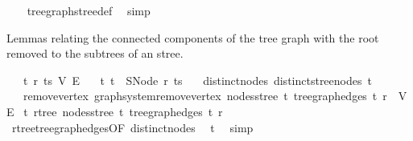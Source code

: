 \begin{isabellebody}
\ \ %
\endisadelimproof
%
\isatagproof
{}\isamarkupfalse%
\ tree{\isacharunderscore}{\kern0pt}graph{\isacharunderscore}{\kern0pt}stree{\isacharunderscore}{\kern0pt}def\ \isamarkupfalse%
\ simp%
\endisatagproof
{\isafoldproof}%
%
\isadelimproof
%
\endisadelimproof
%
\begin{isamarkuptext}%
Lemmas relating the connected components of the tree graph with the root removed to the subtrees of an stree.%
\end{isamarkuptext}\isamarkuptrue%
\isamarkupfalse%
\isanewline
\ \ \ t\ r\ ts\ V{\isacharprime}{\kern0pt}\ E{\isacharprime}{\kern0pt}\isanewline
\ \ \ t{\isacharcolon}{\kern0pt}\ {\isachardoublequoteopen}t\ {\isacharequal}{\kern0pt}\ SNode\ r\ ts{\isachardoublequoteclose}\isanewline
\ \ \ distinct{\isacharunderscore}{\kern0pt}nodes{\isacharcolon}{\kern0pt}\ {\isachardoublequoteopen}distinct{\isacharunderscore}{\kern0pt}stree{\isacharunderscore}{\kern0pt}nodes\ t{\isachardoublequoteclose}\isanewline
\ \ \ remove{\isacharunderscore}{\kern0pt}vertex{\isacharcolon}{\kern0pt}\ {\isachardoublequoteopen}graph{\isacharunderscore}{\kern0pt}system{\isachardot}{\kern0pt}remove{\isacharunderscore}{\kern0pt}vertex\ {\isacharparenleft}{\kern0pt}nodes{\isacharunderscore}{\kern0pt}stree\ t{\isacharparenright}{\kern0pt}\ {\isacharparenleft}{\kern0pt}tree{\isacharunderscore}{\kern0pt}graph{\isacharunderscore}{\kern0pt}edges\ t{\isacharparenright}{\kern0pt}\ r\ {\isacharequal}{\kern0pt}\ {\isacharparenleft}{\kern0pt}V{\isacharprime}{\kern0pt}{\isacharcomma}{\kern0pt}E{\isacharprime}{\kern0pt}{\isacharparenright}{\kern0pt}{\isachardoublequoteclose}\isanewline
{}\isanewline
\isanewline
{}\isamarkupfalse%
\ t{\isacharcolon}{\kern0pt}\ rtree\ {\isachardoublequoteopen}nodes{\isacharunderscore}{\kern0pt}stree\ t{\isachardoublequoteclose}\ {\isachardoublequoteopen}tree{\isacharunderscore}{\kern0pt}graph{\isacharunderscore}{\kern0pt}edges\ t{\isachardoublequoteclose}\ r%
\isadelimproof
\ %
\endisadelimproof
%
\isatagproof
{}\isamarkupfalse%
\ rtree{\isacharunderscore}{\kern0pt}tree{\isacharunderscore}{\kern0pt}graph{\isacharunderscore}{\kern0pt}edges{\isacharbrackleft}{\kern0pt}OF\ distinct{\isacharunderscore}{\kern0pt}nodes{\isacharbrackright}{\kern0pt}\ \isamarkupfalse%
\ t\ \isamarkupfalse%
\ simp%
\endisatagproof
{\isafoldproof}%
%
\isadelimproof
%
\endisadelimproof
\isanewline
\isanewline

\end{isabellebody}
